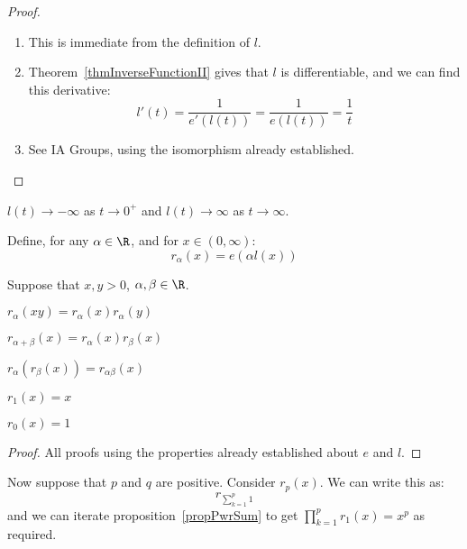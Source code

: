 \documentclass[../Main.tex]{subfiles}
\begin{document}
\begin{proof}
    \begin{enumerate}
        \item This is immediate from the definition of $l$.
        \item Theorem~\ref{thmInverseFunctionII} gives that $l$ is differentiable, and we can find this derivative:
            \begin{equation*}
                l'(t) = \frac{1}{e'(l(t))} = \frac{1}{e(l(t))} = \frac{1}{t}
            \end{equation*}
        \item See IA Groups, using the isomorphism already established.
    \end{enumerate}
\end{proof}
\begin{remark}
    $l(t) \to -\infty$ as $t \to 0^+$ and $l(t) \to \infty$ as $t \to \infty$.
\end{remark}
Define, for any $\alpha \in \R$, and for $x \in (0, \infty)$:
\begin{equation*}
    r_{\alpha}(x) = e(\alpha l(x))
\end{equation*}
\begin{propositions}{
        Suppose that $x, y > 0$, $\alpha, \beta \in \R$.
        \label{propsPwrProps}
    }
    \item $r_\alpha(xy) = r_\alpha(x) r_\alpha(y)$ \label{propPrwMultiply}
    \item $r_{\alpha + \beta}(x) = r_\alpha(x)r_\beta(x)$ \label{propPwrSum}
    \item $r_\alpha(r_\beta(x)) = r_{\alpha\beta}(x)$ \label{propPwrChain}
    \item $r_1(x) = x$ \label{propPwr1Identity}
    \item $r_0(x) = 1$ \label{propPwrZero}
\end{propositions}
\begin{proof}
    All proofs using the properties already established about $e$ and $l$.
\end{proof}
Now suppose that $p$ and $q$ are positive. Consider $r_p(x)$. We can write this as:
\begin{equation*}
    r_{\sum_{k=1}^p 1}
\end{equation*}
and we can iterate proposition~\ref{propPwrSum} to get $\prod_{k = 1}^p r_1(x) = x^p$ as required.
\end{document}
